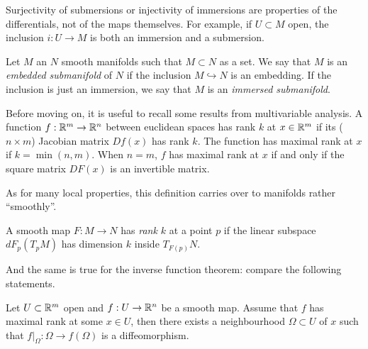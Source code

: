\begin{remark}
  Surjectivity of submersions or injectivity of immersions are properties of the differentials, not of the maps themselves.
  For example, if $U\subset M$ open, the inclusion $i: U \to M$ is both an immersion and a submersion.
\end{remark}

\begin{definition}
  Let $M$ an $N$ smooth manifolds such that $M\subset N$ as a set.
  We say that $M$ is an \emph{embedded submanifold} of $N$ if the inclusion $M\hookrightarrow N$ is an embedding. If the inclusion is just an immersion, we say that $M$ is an \emph{immersed submanifold}.
\end{definition}

Before moving on, it is useful to recall some results from multivariable analysis.
A function $f:\mathbb{R}^m \to \mathbb{R}^n$ between euclidean spaces has rank $k$ at $x\in\mathbb{R}^m$ if its ($n\times m$) Jacobian matrix $Df(x)$ has rank $k$.
The function has maximal rank at $x$ if $k = \min(n,m)$.
When $n=m$, $f$ has maximal rank at $x$ if and only if the square matrix $DF(x)$ is an invertible matrix.

As for many local properties, this definition carries over to manifolds rather ``smoothly''.

\begin{definition}
  A smooth map $F:M\to N$ has \emph{rank $k$} at a point $p$ if the linear subspace $dF_p(T_pM)$ has dimension $k$ inside $T_{F(p)}N$.
\end{definition}

And the same is true for the inverse function theorem:
compare the following statements.

\begin{theorem}\label{thm:ift}
  Let $U\subset\mathbb{R}^m$ open and $f:U \to \mathbb{R}^n$ be a smooth map.
  Assume that $f$ has maximal rank at some $x\in U$, then there exists a neighbourhood $\Omega\subset U$ of $x$ such that  $f\big|_\Omega : \Omega \to f(\Omega)$ is a diffeomorphism.
\end{theorem}

